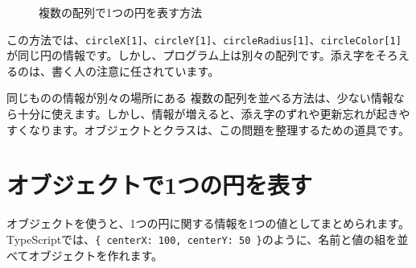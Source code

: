 \begin{figure}[htbp]
    \centering
    \caption{複数の配列で1つの円を表す方法}
    \label{fig:chapter11-parallel-array-limits}
\end{figure}

この方法では、\texttt{circleX[1]}、\texttt{circleY[1]}、\texttt{circleRadius[1]}、\texttt{circleColor[1]}が同じ円の情報です。しかし、プログラム上は別々の配列です。添え字をそろえるのは、書く人の注意に任されています。

\begin{notebox}{同じものの情報が別々の場所にある}
複数の配列を並べる方法は、少ない情報なら十分に使えます。しかし、情報が増えると、添え字のずれや更新忘れが起きやすくなります。オブジェクトとクラスは、この問題を整理するための道具です。
\end{notebox}

\section{オブジェクトで1つの円を表す}

オブジェクトを使うと、1つの円に関する情報を1つの値としてまとめられます。TypeScriptでは、\texttt{\{ centerX: 100, centerY: 50 \}}のように、名前と値の組を並べてオブジェクトを作れます。

\begin{listing}[htbp]
\inputminted{ts}{typescript-p5/listings/chapter11/ball-object-literal.ts}
\caption{オブジェクトで1つの円の情報をまとめる（\texttt{chapter11/ball-object-literal.ts}）}
\label{lst:chapter11-ball-object-literal}
\end{listing}

